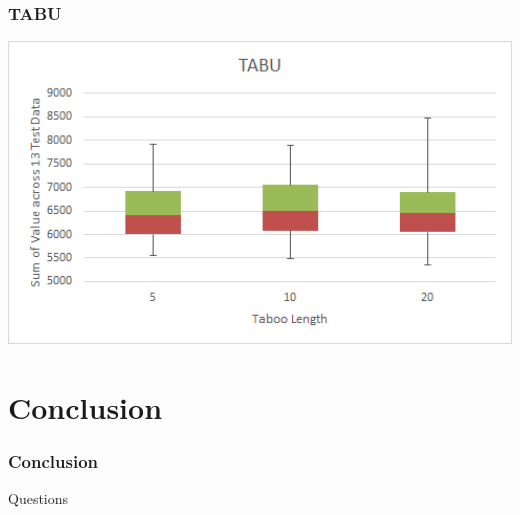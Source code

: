 \documentclass{beamer}
\begin{document}
\begin{frame}
\frametitle{TABU}
 \centerline{\includegraphics[width=1.0\textwidth]{TABU2.png}}
\end{frame}

\section{Conclusion}
\begin{frame}
\frametitle{Conclusion}

\end{frame}


\begin{frame}
\Huge{\centerline{Questions}}
\end{frame}
\end{document}
